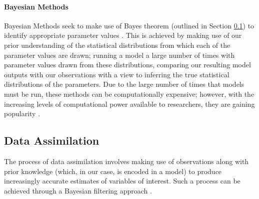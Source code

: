 \paragraph{Bayesian Methods}

Bayesian Methods seek to make use of Bayes theorem (outlined in Section
\ref{sub:lit_rev:da}) to identify appropriate parameter values
\citep{jabot2013easy}.
This is achieved by making use of our prior understanding of the statistical
distributions from which each of the parameter values are drawn; running a model
a large number of times with parameter values drawn from these distributions,
comparing our resulting model outputs with our observations with a view to
inferring the true statistical distributions of the parameters.
Due to the large number of times that models must be run, these methods can be
computationally expensive; however, with the increasing levels of computational
power available to researchers, they are gaining popularity
\citep{van2015calibration, beaumont2010approximate}.

\subsection{Data Assimilation}\label{sub:lit_rev:da}


The process of data assimilation involves making use of observations along with
prior knowledge (which, in our case, is encoded in a model) to produce
increasingly accurate estimates of variables of interest.
Such a process can be achieved through a Bayesian filtering approach
\citep{jazwinski1970mathematics, bar2004estimation}.

